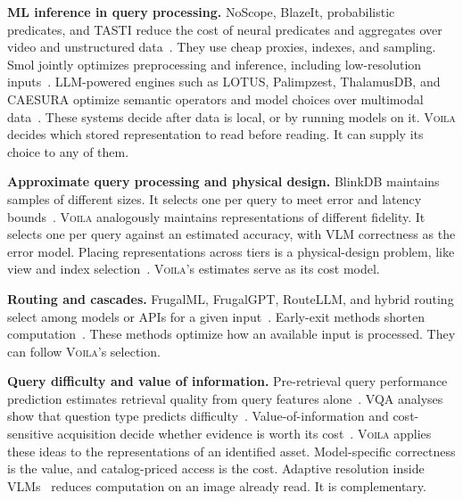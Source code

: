 \documentclass[10pt,conference]{IEEEtran}
\newcommand{\system}{\textsc{Voila}\xspace}
\begin{document}
\textbf{ML inference in query processing.} NoScope, BlazeIt, probabilistic
predicates, and TASTI reduce the cost of neural predicates and aggregates over
video and unstructured data~\cite{kang2017noscope,kang2020blazeit,
lu2018probabilistic,kang2022tasti}. They use cheap proxies, indexes, and
sampling. Smol jointly optimizes preprocessing and inference, including
low-resolution inputs~\cite{kang2020smol}. LLM-powered engines such as LOTUS,
Palimpzest, ThalamusDB, and CAESURA optimize semantic operators and model
choices over multimodal data~\cite{patel2024lotus,liu2025palimpzest,
jo2024thalamusdb,urban2024caesura}. These systems decide after data is local,
or by running models on it. \system decides which stored representation to read
before reading. It can supply its choice to any of them.

\textbf{Approximate query processing and physical design.} BlinkDB maintains
samples of different sizes. It selects one per query to meet error and latency
bounds~\cite{agarwal2013blinkdb}. \system analogously maintains
representations of different fidelity. It selects one per query against an
estimated accuracy, with VLM correctness as the error model. Placing
representations across tiers is a physical-design problem, like
view and index selection~\cite{harinarayan1996cubes,chaudhuri1997autoadmin}.
\system's estimates serve as its cost model.

\textbf{Routing and cascades.} FrugalML, FrugalGPT, RouteLLM, and hybrid routing
select among models or APIs for a given input~\cite{chen2020frugalml,
chen2023frugalgpt,wang2024routellm,ding2024hybrid,shnitzer2023large}.
Early-exit methods shorten computation~\cite{zhou2020bert,
schuster2022confident}. These methods optimize how an available input is
processed. They can follow \system's selection.

\textbf{Query difficulty and value of information.} Pre-retrieval query
performance prediction estimates retrieval quality from query features
alone~\cite{zhao2008predicting,hauff2008improved,mothe2005linguistic}. VQA
analyses show that question type predicts difficulty~\cite{kafle2017analysis,
agrawal2018dont}. Value-of-information and cost-sensitive acquisition decide
whether evidence is worth its cost~\cite{bilgic2011value,karkkainen2019cost,
kossen2022active}. \system applies these ideas to the representations of an
identified asset. Model-specific correctness is the value, and catalog-priced
access is the cost. Adaptive resolution inside VLMs~\cite{cai2024matryoshka,
chen2024fastv,kimhi2025cares} reduces computation on an image already read. It
is complementary.
\end{document}
